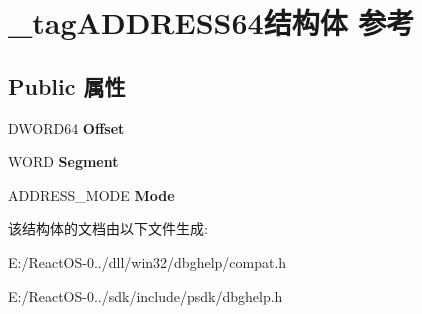 \hypertarget{struct__tag_a_d_d_r_e_s_s64}{}\section{\+\_\+tag\+A\+D\+D\+R\+E\+S\+S64结构体 参考}
\label{struct__tag_a_d_d_r_e_s_s64}
\subsection*{Public 属性}
\begin{DoxyCompactItemize}
\item 
\mbox{\label{struct__tag_a_d_d_r_e_s_s64_aeaa6b0d173d45003450b921601df6543}} 
D\+W\+O\+R\+D64 {\bfseries Offset}
\item 
\mbox{\label{struct__tag_a_d_d_r_e_s_s64_a69f23702d27f4f87c2dc1bc357177c52}} 
W\+O\+RD {\bfseries Segment}
\item 
\mbox{\label{struct__tag_a_d_d_r_e_s_s64_ad00383c28d4929ecaa9474315e136177}} 
A\+D\+D\+R\+E\+S\+S\+\_\+\+M\+O\+DE {\bfseries Mode}
\end{DoxyCompactItemize}


该结构体的文档由以下文件生成\+:\begin{DoxyCompactItemize}
\item 
E\+:/\+React\+O\+S-\/0../dll/win32/dbghelp/compat.\+h\item 
E\+:/\+React\+O\+S-\/0../sdk/include/psdk/dbghelp.\+h\end{DoxyCompactItemize}
